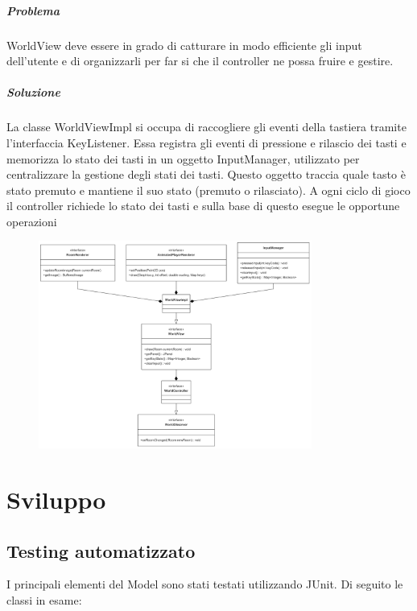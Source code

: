 \documentclass[a4paper,12pt]{report}
\begin{document}
\paragraph{Problema} %
WorldView deve essere in grado di catturare in modo efficiente gli input dell'utente e di organizzarli per far si che il controller ne possa fruire e gestire.
\paragraph{Soluzione} %
La classe WorldViewImpl si occupa di raccogliere gli eventi della tastiera tramite l'interfaccia KeyListener. Essa registra gli eventi di pressione e rilascio dei tasti e memorizza lo stato dei tasti in un oggetto InputManager, utilizzato per centralizzare la gestione degli stati dei tasti. Questo oggetto traccia quale tasto è stato premuto e mantiene il suo stato (premuto o rilasciato). A ogni ciclo di gioco il controller richiede lo stato dei tasti e sulla base di questo esegue le opportune operazioni
\begin{figure}[h]
    \centering
    \includegraphics[width=0.8\textwidth]{img/WorldView.png}
    \label{img:WorldView}
\end{figure}

\chapter{Sviluppo}
\section{Testing automatizzato}
I principali elementi del Model sono stati testati utilizzando JUnit. Di seguito le classi in esame:
\end{document}
